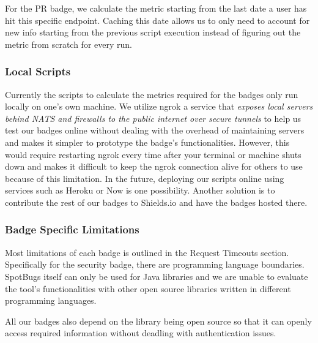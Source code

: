 \documentclass[12pt, letterpaper]{article}
\begin{document}
For the PR badge, we calculate the metric starting from the last date a user has hit this specific endpoint.
Caching this date allows us to only need to account for new info starting from the previous script execution
instead of figuring out the metric from scratch for every run.


\subsubsection{Local Scripts}
Currently the scripts to calculate the metrics required for the badges only run
locally on one's own machine. We utilize ngrok
\cite{ngrok} a service that \textit{exposes local servers behind NATS and firewalls to the public
internet over secure tunnels} to help us test our badges online without dealing with the overhead of maintaining
servers and makes it simpler to prototype the badge's functionalities. 
However, this would require restarting ngrok every time after your terminal or machine shuts down
and makes it difficult to keep the ngrok connection alive for others to use because of this limitation.
In the future, deploying our scripts online using services such as Heroku \cite{heroku} or Now \cite{nowjs}
is one possibility. Another solution is to contribute the rest of our badges to Shields.io \cite{shieldsrepo}
and have the badges hosted there.

\subsubsection{Badge Specific Limitations}
Most limitations of each badge is outlined in the Request Timeouts section.
Specifically for the security badge, there are programming language boundaries.
SpotBugs \cite{spotbugs} itself can only be used for Java libraries and we are 
unable to evaluate the tool's functionalities with other open source libraries written
in different programming languages.


All our badges also depend on the library being open source so that it can openly
access required information without deadling with authentication issues.
\end{document}
